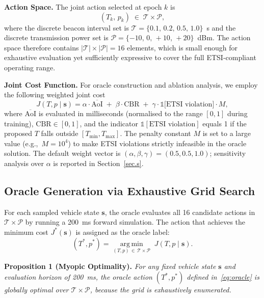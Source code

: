 \documentclass[journal]{IEEEtran}
\begin{document}
\textbf{Action Space.}  The joint action selected at epoch $k$ is
\begin{equation}
  (T_k,\, p_k) \;\in\; \mathcal{T} \times \mathcal{P},
  \label{eq:action_space}
\end{equation}
where the discrete beacon interval set is
$\mathcal{T} = \{0.1,\, 0.2,\, 0.5,\, 1.0\}$~s
and the discrete transmission power set is
$\mathcal{P} = \{-10,\, 0,\, +10,\, +20\}$~dBm.
The action space therefore contains $|\mathcal{T}| \times |\mathcal{P}|
= 16$ elements, which is small enough for exhaustive evaluation yet
sufficiently expressive to cover the full ETSI-compliant operating range.

\textbf{Joint Cost Function.}  For oracle construction and ablation
analysis, we employ the following weighted joint cost
\begin{equation}
  J(T, p \mid \mathbf{s}) =
  \alpha \cdot \overline{\text{AoI}}
  \;+\;
  \beta \cdot \text{CBR}
  \;+\;
  \gamma \cdot \mathbb{1}\bigl[\text{ETSI violation}\bigr] \cdot M,
  \label{eq:cost}
\end{equation}
where $\overline{\text{AoI}}$ is evaluated in milliseconds (normalised
to the range $[0,1]$ during training), $\text{CBR} \in [0,1]$, and
the indicator $\mathbb{1}[\text{ETSI violation}]$ equals 1 if the
proposed $T$ falls outside $[T_{\min}, T_{\max}]$.  The penalty
constant $M$ is set to a large value (e.g.,\ $M = 10^4$) to make
ETSI violations strictly infeasible in the oracle solution.
The default weight vector is $(\alpha, \beta, \gamma) = (0.5, 0.5, 1.0)$;
sensitivity analysis over $\alpha$ is reported in Section~\ref{sec.s}.

\subsection{Oracle Generation via Exhaustive Grid Search}
\label{subsec:2}

For each sampled vehicle state $\mathbf{s}$, the oracle evaluates all
16 candidate actions in $\mathcal{T} \times \mathcal{P}$ by running a
200~ms forward simulation.  The action that achieves the minimum cost
$J^{*}(\mathbf{s})$ is assigned as the oracle label:
\begin{equation}
  (T^{*}, p^{*}) = \underset{(T,p)\,\in\,\mathcal{T}\times\mathcal{P}}
  {\operatorname{arg\,min}}\;
  J(T, p \mid \mathbf{s}).
  \label{eq:oracle}
\end{equation}

\textbf{Proposition 1 (Myopic Optimality).}
\textit{For any fixed vehicle state $\mathbf{s}$ and evaluation
horizon of 200~ms, the oracle action $(T^{*}, p^{*})$ defined
in~\eqref{eq:oracle} is globally optimal over $\mathcal{T} \times
\mathcal{P}$, because the grid is exhaustively enumerated.}
\end{document}
